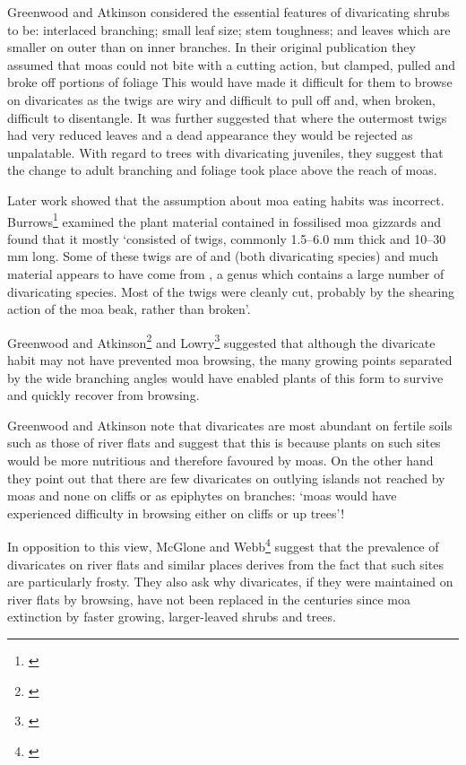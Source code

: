 Greenwood and Atkinson considered the essential features of divaricating shrubs to be: interlaced branching; small leaf size; stem toughness; and leaves which are smaller on outer than on inner branches.
In their original publication they assumed that moas could not bite with a cutting action, but clamped, pulled and broke off portions of foliage This would have made it difficult for them to browse on divaricates as the twigs are wiry and difficult to pull off and, when broken, difficult to disentangle.
It was further suggested that where the outermost twigs had very reduced leaves and a dead appearance they would be rejected as unpalatable.
With regard to trees with divaricating juveniles, they suggest that the change to adult branching and foliage took place above the reach of moas.

Later work showed that the assumption about moa eating habits was incorrect.
Burrows\footnote{\cite{burrows1980moas}} examined the plant material contained in fossilised moa gizzards and found that it mostly `consisted of twigs, commonly 1.5–6.0 mm thick and 10–30 mm long.
Some of these twigs are of  and  (both divaricating species) and much material appears to have come from , a genus which contains a large number of divaricating species.
Most of the twigs were cleanly cut, probably by the shearing action of the moa beak, rather than broken'.

Greenwood and Atkinson\footnote{\cite{atkinson1980divaricating}} and Lowry\footnote{\cite{lowry1980evolution}} suggested that although the divaricate habit may not have prevented moa browsing, the many growing points separated by the wide branching angles would have enabled plants of this form to survive and quickly recover from browsing.

Greenwood and Atkinson note that divaricates are most abundant on fertile soils such as those of river flats and suggest that this is because plants on such sites would be more nutritious and therefore favoured by moas.
On the other hand they point out that there are few divaricates on outlying islands not reached by moas and none on cliffs or as epiphytes on branches: `moas would have experienced difficulty in browsing either on cliffs or up trees'!

In opposition to this view, McGlone and Webb\footnote{\cite{mcglone1981selective}} suggest that the prevalence of divaricates on river flats and similar places derives from the fact that such sites are particularly frosty.
They also ask why divaricates, if they were maintained on river flats by browsing, have not been replaced in the centuries since moa extinction by faster growing, larger-leaved shrubs and trees.

